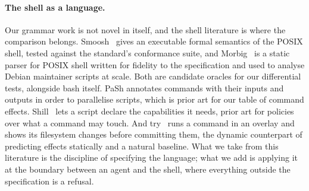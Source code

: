 \paragraph{The shell as a language.}
Our grammar work is not novel in itself, and the shell literature is where the comparison
belongs. Smoosh~\cite{smoosh} gives an executable formal semantics of the POSIX shell, tested
against the standard's conformance suite, and Morbig~\cite{morbig} is a static parser for POSIX
shell written for fidelity to the specification and used to analyse Debian maintainer scripts
at scale. Both are candidate oracles for our differential tests, alongside bash itself. PaSh
\cite{pash} annotates commands with their inputs and outputs in order to parallelise scripts,
which is prior art for our table of command effects. Shill~\cite{shill} lets a script declare the
capabilities it needs, prior art for policies over what a command may touch. And try~\cite{try}
runs a command in an overlay and shows its filesystem changes before committing them, the
dynamic counterpart of predicting effects statically and a natural baseline. What we take from
this literature is the discipline of specifying the language; what we add is applying it at the
boundary between an agent and the shell, where everything outside the specification is a
refusal.
